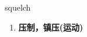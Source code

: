 
\begin{frame}
{\huge squelch}
\begin{center}
\begin{enumerate}\Large
  \item \textbf{压制，镇压(运动)}
\end{enumerate}
\end{center}
\end{frame}
